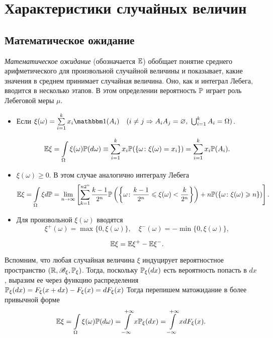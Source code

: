 \documentclass[../TV&MS.tex]{subfiles}
\begin{document}
    
\section{Характеристики случайных величин}

\subsection{Математическое ожидание}

\emph{Математическое ожидание} (обозначается $\mathbb{E}$) обобщает понятие среднего 
арифметического для произвольной случайной величины и показывает, какие значения 
в среднем принимает случайная величина. Оно, как и интеграл Лебега, вводится в 
несколько этапов. В этом определении вероятность $\mathbb{P}$ играет роль
Лебеговой меры $\mu$.

\begin{itemize}
 	\item Если $\xi(\omega) = \sum\limits_{i=1}^kx_i \Ind(A_i) \quad (i \not= j 
 	\Rightarrow A_iA_j = \varnothing, \ \bigcup_{i=1}^k A_i = \Omega)$. 
 	
 	$$\mathbb{E} \xi = \int\limits_{\Omega} \xi(\omega) \mathbb{P}(d\omega) \equiv 
 	\sum\limits_{i=1}^k x_i \mathbb{P}(\left\{ \omega \colon \xi(\omega)=x_i \right\}) =  
 	\sum\limits_{i=1}^k x_i \mathbb{P}(A_i).$$

	\item $\xi(\omega) \ge 0$. В этом случае аналогично интегралу Лебега
	$$ \mathbb{E} \xi = \int\limits_{\Omega} \xi d\mathbb{P} = \lim_{n \to \infty}  
	\left[\sum\limits_{k=1}^{n2^n} \frac{k-1}{2^n} \mathbb{P}\left(
	\left\{ \omega \colon \frac{k-1}{2^n} \leqslant \xi(\omega) < \frac{k}{2^n} \right\}\right) 
	+ n \mathbb{P}(\left\{ \omega \colon \xi(\omega) \geqslant n \right\})\right].$$
	
	\item Для произвольной $\xi(\omega)$ вводятся
	$$ \xi^+(\omega) = \max\{0, \xi(\omega)\},\quad 
	\xi^-(\omega) = -\min\{0, \xi(\omega)\},$$

	$$ \mathbb{E} \xi = \mathbb{E} \xi^+ - \mathbb{E} \xi^-.$$
\end{itemize}

Вспомним, что любая случайная величина $\xi$ индуцирует вероятностное 
пространство $(\mathbb{R}, \mathscr{B}_\xi, \mathbb{P}_\xi)$. Тогда, поскольку $\mathbb{P}_\xi(dx)$ есть 
вероятность попасть в $dx$, выразим ее через функцию распределения $\mathbb{P}_\xi(dx) 
= F_\xi(x + dx) - F_\xi(x) = dF_\xi(x)$ Тогда перепишем матожидание в более 
привычной форме
$$\mathbb{E}\xi = \int\limits_{\Omega} \xi(\omega) \mathbb{P}(d\omega) = 
\int\limits_{-\infty}^{+\infty} x \mathbb{P}_\xi(dx) = 
\int\limits_{-\infty}^{+\infty} x dF_\xi(x).$$
\end{document}
